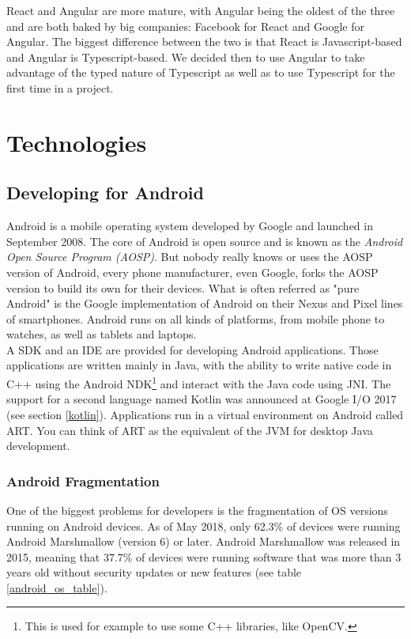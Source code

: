 \documentclass[11pt,a4paper]{report}
\begin{document}
React and Angular are more mature, with Angular being the oldest of the three and are both baked by big companies: Facebook for React and Google for Angular. The biggest difference between the two is that React is Javascript-based and Angular is Typescript-based. We decided then to use Angular to take advantage of the typed nature of Typescript as well as to use Typescript for the first time in a project.

\chapter{Technologies}
\section{Developing for Android}
\label{android_chapter}
Android is a mobile operating system developed by Google and launched in September 2008. The core of Android is open source and is known as the \emph{Android Open Source Program (AOSP)}. But nobody really knows or uses the AOSP version of Android, every phone manufacturer, even Google, forks the AOSP version to build its own for their devices. What is often referred as "pure Android" is the Google implementation of Android on their Nexus and Pixel lines of smartphones. Android runs on all kinds of platforms, from mobile phone to watches, as well as tablets and laptops. \\

A SDK and an IDE are provided for developing Android applications. Those applications are written mainly in Java, with the ability to write native code in C++ using the Android NDK\footnote{This is used for example to use some C++ libraries, like OpenCV.} and interact with the Java code using JNI. The support for a second language named Kotlin was announced at Google I/O 2017 (see section \ref{kotlin}). Applications run in a virtual environment on Android called ART. You can think of ART as the equivalent of the JVM for desktop Java development.
\subsection{Android Fragmentation}
One of the biggest problems for developers is the fragmentation of OS versions running on Android devices. As of May 2018, only 62.3\% of devices were running Android Marshmallow (version 6) or later. Android Marshmallow was released in 2015, meaning that 37.7\% of devices were running software that was more than 3 years old without security updates or new features (see table \ref{android_os_table}).
\end{document}
